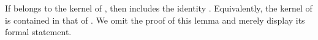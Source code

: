 \begin{code}
\AgdaSymbol{\}}\AgdaSpace{}%
\AgdaSpace{}%
\AgdaSymbol{(}\AgdaSpace{}%
\AgdaSymbol{)}\AgdaSpace{}%
\AgdaSpace{}%
\AgdaSpace{}%
\AgdaSpace{}%
\AgdaSpace{}%
\AgdaSpace{}%
\AgdaSpace{}%
\AgdaSpace{}%
\AgdaSpace{}%
\AgdaSpace{}%
\AgdaSpace{}%
\AgdaSpace{}%
\<%
\\
%
\>[2]\AgdaSpace{}%
\AgdaSpace{}%
\AgdaSpace{}%
\AgdaSpace{}%
\AgdaSymbol{=}\AgdaSpace{}%
\AgdaSpace{}%
\AgdaSpace{}%
\AgdaSpace{}%
\AgdaSpace{}%
\AgdaSpace{}%
\AgdaSpace{}%
\AgdaSpace{}%
\AgdaSpace{}%
\AgdaSymbol{)}\AgdaSpace{}%
\AgdaSpace{}%
\AgdaSpace{}%
\AgdaSpace{}%
\AgdaSpace{}%
\AgdaSymbol{(}\AgdaSpace{}%
\AgdaSymbol{)}\AgdaSpace{}%
\<%
\\
%
\\[\AgdaEmptyExtraSkip]%
%
\>[1]\AgdaSpace{}%
\AgdaSymbol{:}\AgdaSpace{}%
\AgdaSpace{}%
\AgdaOperator{\AgdaFunction{𝔽[}}\AgdaSpace{}%
\AgdaSpace{}%
\AgdaOperator{\AgdaFunction{]}}\AgdaSpace{}%
\<%
\\
%
\>[1]\AgdaSpace{}%
\AgdaSymbol{=}\AgdaSpace{}%
\AgdaSpace{}%
\AgdaSpace{}%
\AgdaSpace{}%
\AgdaSpace{}%
\AgdaOperator{\AgdaFunction{homF[}}\AgdaSpace{}%
\AgdaSpace{}%
\AgdaOperator{\AgdaFunction{]}}\AgdaSpace{}%
\AgdaSpace{}%
\AgdaSymbol{(}\AgdaSpace{}%
\AgdaSpace{}%
\AgdaOperator{\AgdaFunction{epiF[}}\AgdaSpace{}%
\AgdaSpace{}%
\AgdaOperator{\AgdaFunction{]}}\AgdaSpace{}%
\AgdaSymbol{)}\AgdaSpace{}%
\<%
\\
\>[0]\<%
\end{code}
If  belongs to the kernel of , then
  includes the identity   .
Equivalently,
the kernel of  is contained in that of .
\ifshort
We omit the proof of this lemma and merely display its formal statement.
\else
\fi

